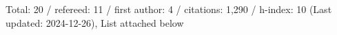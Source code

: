 Total: 20 / refereed: 11 / first author: 4 / citations: 1,290 / h-index: 10 (Last updated: 2024-12-26), List attached below